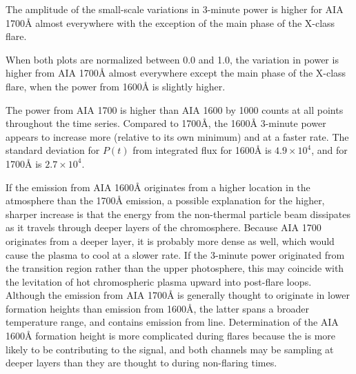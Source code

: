 The amplitude of the small-scale variations in 3-minute
power is higher for AIA 1700\AA{} almost everywhere with
the exception of the main phase of the X-class flare.

When both plots are normalized between 0.0 and 1.0, the variation in
power is higher from AIA 1700\AA{} almost everywhere except the main phase of the
X-class flare, when the power from 1600\AA{} is slightly higher.

The power from AIA 1700 is higher than AIA 1600 by
1000 counts at all points throughout the time series.
Compared to 1700\AA{},
the 1600\AA{} 3-minute power appears to increase more
(relative to its own minimum) and at a faster rate.
The standard deviation for $P(t)$ from integrated flux
for 1600\AA{} is $4.9 \times 10^{4}$, and
for 1700\AA{} is $2.7 \times 10^{4}$.

If the emission from AIA 1600\AA{}
originates from a higher location in the atmosphere
than the 1700\AA{} emission,
a possible explanation for the higher, sharper increase
is that the energy from the non-thermal particle beam
dissipates as it travels through deeper layers of the chromosphere.
Because AIA 1700 originates from a deeper layer, it is probably more dense
as well, which would cause the plasma to cool at a slower rate.
If the 3-minute power originated from the transition region rather than the
upper photosphere, this may coincide with the levitation of hot chromospheric
plasma upward into post-flare loops.
Although the emission from AIA 1700\AA{} is generally thought to originate
in lower formation heights than emission from 1600\AA{},
the latter spans a broader temperature range, and contains
emission from  line.
Determination of the AIA 1600\AA{} formation height is more complicated
during flares because the  is more likely to be contributing
to the signal, and both channels may be sampling at deeper layers than
they are thought to during non-flaring times.
